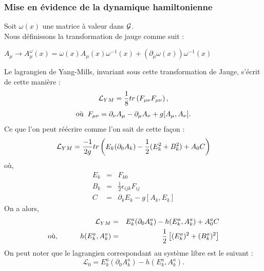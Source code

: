 \documentclass[a4paper,11pt]{article}
\theoremstyle{plain}
\theoremstyle{definition}
\theoremstyle{remark}
\numberwithin{equation}{section}
\numberwithin{equation}{subsection}
\numberwithin{figure}{section}
\begin{document}
\subsubsection{Mise en évidence de la dynamique hamiltonienne}

\noindent
Soit $\omega(x)$ une matrice à valeur dans $\cal{G}$.\\
Nous définissons la transformation de jauge comme suit :
\begin{center}
$A_{\mu} \rightarrow  A^{\omega}_{\mu}(x)=\omega(x)A_{\mu}(x)\omega^{-1}(x) + ( \partial_{\mu} \omega(x) ) \omega^{-1}(x)$
\end{center}
Le lagrangien de Yang-Mills, invariant sous cette transformation de Jauge, s'écrit de cette manière : 
\begin{eqnarray}
\mathcal{L}_{\small YM} = \frac{1}{8} tr\left(F_{\mu\nu}F_{\mu \nu}\right),
\end{eqnarray}
\begin{eqnarray}
\text{où} \hspace{2mm} F_{\mu \nu}=\partial_{\nu}A_{\mu} - \partial_{\mu}A_{\nu} + g[A_{\mu},A_{\nu}].
\end{eqnarray}
Ce que l'on peut réécrire comme l'on sait de cette façon :
\begin{eqnarray}
\mathcal{L}_{\small YM} = \frac{-1}{2g} tr\left( E_{k}(\partial_{0} A_{k}) - \frac{1}{2}(E_{k}^{2} + B_{k}^2) + A_{0}C\right)
\end{eqnarray}
où, 
\begin{eqnarray}
 E_k &=& F_{k0}\\
 B_k &=& \frac{1}{2} \epsilon_{ijk} F_{ij}\\
   C &=& \partial_{k} E_{k} - g[A_k , E_k] 
\end{eqnarray}
On a alors,
\begin{eqnarray}
 \mathcal{L}_{\small YM} &=& E_{k}^{a}(\partial_{0} A_{k}^{a}) - h(E_{k}^{a},A_{k}^{a}) + A_{0}^{a}C\\
 \text{où, \hspace{1cm}} h(E_{k}^{a},A_{k}^{a}) &=& \frac{1}{2}\left[(E_{k}^{a})^{2} + (B_{k}^{a})^2 \right]
\end{eqnarray}
On peut noter que le lagrangien correspondant au système libre est le suivant :
\begin{equation}
 \mathcal{L}_{0} = E_{k}^{a}(\partial_{0} A_{k}^{a}) - h(E_{k}^{a},A_{k}^{a}).
\end{equation}
\end{document}
